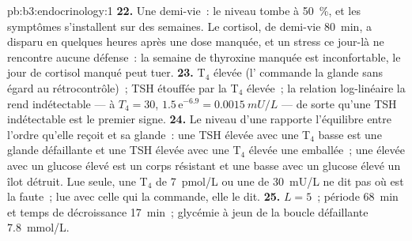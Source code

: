\begin{solution}{pb:b3:endocrinology:1}
\textbf{22.} Une demi-vie~: le niveau tombe à \qty{50}{\%}, et les
symptômes s'installent sur des semaines. Le cortisol, de demi-vie
\qty{80}{min}, a disparu en quelques heures après une dose manquée, et
un stress ce jour-là ne rencontre aucune défense~: la semaine de
thyroxine manquée est inconfortable, le jour de cortisol manqué peut
tuer.
\textbf{23.} T$_{4}$ élevée (l' commande la glande sans égard
au rétrocontrôle)~; TSH étouffée par la T$_{4}$ élevée~; la relation
log-linéaire la rend indétectable --- à $T_{4} = 30$, $1.5\,\mathrm{e}^{-6.9}
= \qty{0.0015}{mU/L}$ --- de sorte qu'une TSH indétectable est le
premier signe.
\textbf{24.} Le niveau d'une  rapporte l'équilibre entre l'ordre
qu'elle reçoit et sa glande~: une TSH élevée avec une T$_{4}$ basse est
une glande défaillante et une TSH élevée avec une T$_{4}$ élevée une
 emballée~; une  élevée avec un glucose élevé est un
corps résistant et une  basse avec un glucose élevé un îlot
détruit. Lue seule, une T$_{4}$ de \qty{7}{pmol/L} ou une  de
\qty{30}{mU/L} ne dit pas où est la faute~; lue avec celle qui la
commande, elle le dit.
\textbf{25.}  $L = 5$~; période \qty{68}{min} et temps de
décroissance \qty{17}{min}~; glycémie à jeun de la boucle défaillante \qty{7.8}{mmol/L}.
\end{solution}
